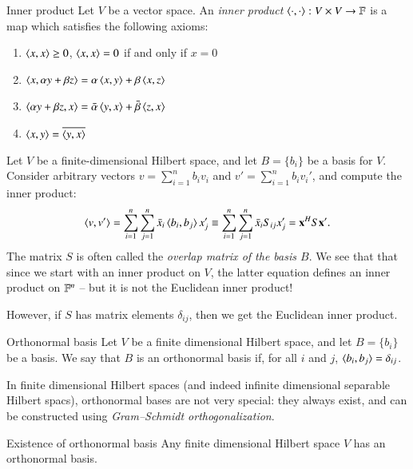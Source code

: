 \begin{myDefinition}{Inner product}{}
    Let $V$ be a vector space.
    An \emph{inner product} $\braket{\cdot, \cdot} : V\times V \to \mathbb{F}$ is a map which satisfies the following axioms:
   \begin{enumerate}
       \item $\braket{x,x} \geq 0$, \quad $\braket{x,x} = 0$ if and only if $x = 0$ \hfill {}
       \item $\braket{x,\alpha y + \beta z} = \alpha\braket{x,y} + \beta\braket{x,z}$ 
       \item $\braket{\alpha y + \beta z, x} = \bar{\alpha}\braket{y,x} + \bar{\beta}\braket{z,x}$ 
       \item $\braket{x,y} = \overline{\braket{y,x}}$ 
   \end{enumerate}
\end{myDefinition}

Let $V$ be a finite-dimensional Hilbert space, and let $B = \{b_i\}$ be a basis for $V$. Consider arbitrary vectors $v = \sum_{i=1}^n b_i v_i$ and $v' = \sum_{i=1}^n b_i v_i'$, and compute the inner product:
\begin{equation}
    \braket{v,v'} = \sum_{i=1}^n\sum_{j=1}^n \bar{x}_i \braket{b_i, b_j} x_j' \equiv \sum_{i=1}^n\sum_{j=1}^n \bar{x}_i S_{ij} x_j' =  \mathbf{x}^H S \mathbf{x}'.
\end{equation}
The matrix $S$ is often called the \emph{overlap matrix of the basis $B$}. We see that that since we start with an inner product on $V$, the latter equation defines an inner product on $\mathbb{F}^n$ -- but it is not the Euclidean inner product!

However, if $S$ has matrix elements $\delta_{ij}$, then we get the Euclidean inner product.

\begin{myDefinition}{Orthonormal basis}{}
Let $V$ be a finite dimensional Hilbert space, and let $B = \{b_i\}$ be a basis. We say that $B$ is an orthonormal basis if, for all $i$ and $j$, $\braket{b_i,b_j} = \delta_{ij}$.
\end{myDefinition}

In finite dimensional Hilbert spaces (and indeed infinite dimensional separable Hilbert spacs), orthonormal bases are not very special: they always exist, and can be constructed using \emph{Gram--Schmidt orthogonalization}.

\begin{myTheorem}{Existence of orthonormal basis}{}
    Any finite dimensional Hilbert space $V$ has an orthonormal basis.
\end{myTheorem}


